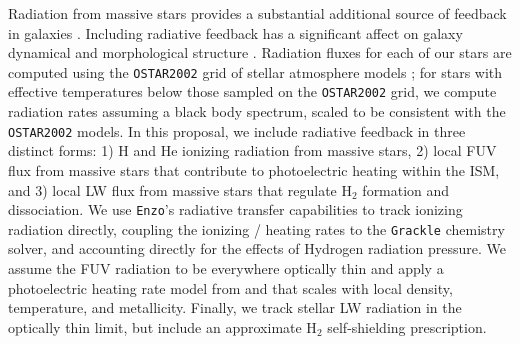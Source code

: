 \documentclass[11pt]{article}
\newcommand{\eg}{e.g.,}
\begin{document}

Radiation from massive stars provides a substantial additional source of feedback in galaxies \citep[\eg][]{Agertz2013}. Including radiative feedback has a significant affect on galaxy dynamical and morphological structure \citep[\eg][]{WiseAbel2012, Kim2013a, Kim2013b, Roskar2014, Rosdahl2015}. Radiation fluxes for each of our stars are computed using the \texttt{OSTAR2002} grid of stellar atmosphere models \citep{Lanz2003}; for stars with effective temperatures below those sampled on the \texttt{OSTAR2002} grid, we compute radiation rates assuming a black body spectrum, scaled to be consistent with the \texttt{OSTAR2002} models. In this proposal, we include radiative feedback in three distinct forms: 1) H and He ionizing radiation from massive stars, 2) local FUV flux from massive stars that contribute to photoelectric heating within the ISM, and 3) local LW flux from massive stars that regulate H$_{2}$ formation and dissociation. 
We use \texttt{Enzo}'s radiative transfer capabilities \citep{Wise2012a,WiseAbel2012,Wise2014} to track ionizing radiation directly, coupling the ionizing / heating rates to the \texttt{Grackle} chemistry solver, and accounting directly for the effects of Hydrogen radiation pressure. We assume the FUV radiation to be everywhere optically thin and apply a photoelectric heating rate model from \cite{BakesTielens1994} and \cite{Wolfire2003} that scales with local density, temperature, and metallicity. Finally, we track stellar LW radiation in the optically thin limit, but include an approximate H$_{2}$ self-shielding prescription.
\end{document}
